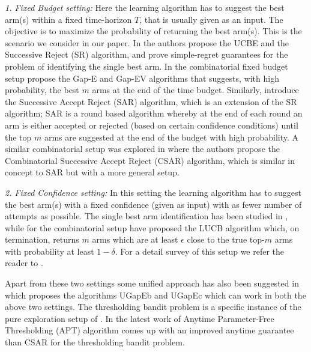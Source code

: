 	\emph{1. Fixed Budget setting:} Here the learning algorithm has to suggest the best arm(s) within a fixed time-horizon $T$, that is usually given as an input. The objective is to maximize the probability of returning the best arm(s).  This is the scenario we consider in our paper. In \cite{audibert2010best} the authors propose the  UCBE and the Successive Reject (SR) algorithm, and prove simple-regret guarantees for the problem of identifying the single best arm.  In the combinatorial fixed budget setup \cite{gabillon2011multi} propose the Gap-E and Gap-EV algorithms that suggests, with high probability, the best $m$ 
	 arms at the end of the time budget. Similarly, \cite{bubeck2013multiple} introduce the  Successive Accept Reject (SAR) algorithm, which is an extension of the SR algorithm; SAR is a round based algorithm whereby at the end of each round an arm is either accepted or rejected (based on certain confidence conditions) until the top $m$ arms are suggested at the end of the budget with high probability. A similar combinatorial setup was explored in \cite{chen2014combinatorial} where the authors propose the Combinatorial Successive Accept Reject (CSAR) algorithm, which is similar in concept to SAR but with a more general setup. 

	\emph{2. Fixed Confidence setting:} In this setting the learning algorithm has to suggest the best arm(s) with a fixed confidence (given as input) with as fewer number of attempts as possible. The single best arm identification has been studied in \cite{even2006action}, while for the combinatorial setup \cite{kalyanakrishnan2012pac} have proposed the LUCB algorithm which, on termination, returns  $m$ arms which are at least $\epsilon$ close to the true top-$m$ arms with probability at least $1-\delta$. For a detail survey of this setup we refer the reader to \cite{jamieson2014best}. 

Apart from these two settings some unified approach has also been suggested in \cite{gabillon2012best} which proposes the algorithms UGapEb and UGapEc which can work in both the above two settings. The thresholding bandit problem is a specific instance of the pure exploration setup of \cite{chen2014combinatorial}. In the latest work of \cite{locatelli2016optimal} Anytime Parameter-Free Thresholding (APT) algorithm comes up with an improved anytime guarantee than CSAR for the thresholding bandit problem.	
	
